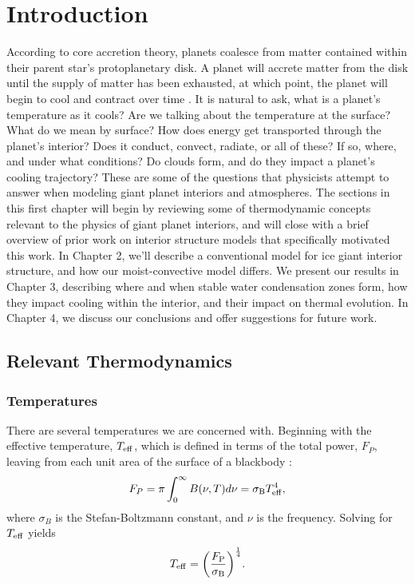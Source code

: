 \documentclass[11pt]{ucscthesisbs}
\begin{document}

\chapter{Introduction}
According to core accretion theory, planets coalesce from matter contained within their parent star's protoplanetary disk. A planet will accrete matter from the disk until the supply of matter has been exhausted, at which point, the planet will begin to cool and contract over time \citep{2007prpl.conf..591L,2013apf..book.....A}. It is natural to ask, what is a planet's temperature as it cools? Are we talking about the temperature at the surface? What do we mean by surface? How does energy get transported through the planet's interior? Does it conduct, convect, radiate, or all of these? If so, where, and under what conditions? Do clouds form, and do they impact a planet's cooling trajectory? These are some of the questions that physicists attempt to answer when modeling giant planet interiors and atmospheres. The sections in this first chapter will begin by reviewing some of thermodynamic concepts relevant to the physics of giant planet interiors, and will close with a brief overview of prior work on interior structure models that specifically motivated this work. In Chapter 2, we'll describe a conventional model for ice giant interior structure, and how our moist-convective model differs. We present our results in Chapter 3, describing where and when stable water condensation zones form, how they impact cooling within the interior, and their impact on thermal evolution. In Chapter 4, we discuss our conclusions and offer suggestions for future work.

\section{Relevant Thermodynamics}
\subsection{Temperatures}
There are several temperatures we are concerned with. Beginning with the effective temperature, $T_{\rm eff}$, which is defined in terms of the total power, $F_{P}$, leaving from each unit area of the surface of a blackbody \citep{pierrehumbert_2010}:
\begin{equation}
   F_{P} =  \pi \int_{0}^{\infty} B(\nu, T) d\nu = \sigma_{\rm B}T_{\rm eff}^{4},
  \label{eq:effective_temp_integral}
\end{equation}  
where $\sigma_{B}$ is the Stefan-Boltzmann constant, and $\nu$ is the frequency. Solving for $T_{\rm eff}$ yields
\begin{equation}
    T_{\rm eff} = \bigg(\frac{F_{\rm P}}{\sigma_{\rm B}}\bigg)^{\frac{1}{4}}.
  \label{eq:effective_temp}
\end{equation}
\end{document}
